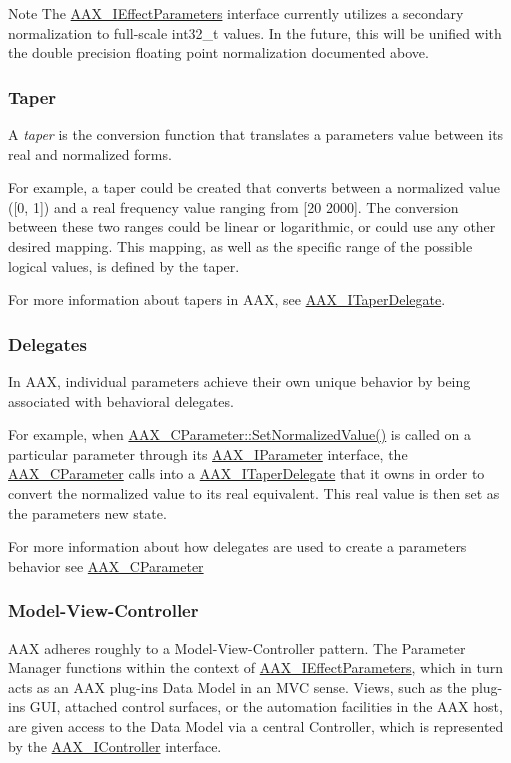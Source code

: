 \begin{DoxyNote}{Note}
The \hyperlink{a00099}{A\+A\+X\+\_\+\+I\+Effect\+Parameters} interface currently utilizes a secondary normalization to full-\/scale int32\+\_\+t values. In the future, this will be unified with the double precision floating point normalization documented above.
\end{DoxyNote}
\hypertarget{a00344_taper}{}\subsubsection{Taper}\label{a00344_taper}
A {\itshape taper} is the conversion function that translates a parameter\textquotesingle{}s value between its real and normalized forms.

For example, a taper could be created that converts between a normalized value (\mbox{[}0, 1\mbox{]}) and a real frequency value ranging from \mbox{[}20 2000\mbox{]}. The conversion between these two ranges could be linear or logarithmic, or could use any other desired mapping. This mapping, as well as the specific range of the possible logical values, is defined by the taper.

For more information about tapers in A\+A\+X, see \hyperlink{a00114}{A\+A\+X\+\_\+\+I\+Taper\+Delegate}.\hypertarget{a00344_delegates}{}\subsubsection{Delegates}\label{a00344_delegates}
In A\+A\+X, individual parameters achieve their own unique behavior by being associated with behavioral delegates.

For example, when \hyperlink{a00033_ac4f8ae8c5ecb2cd04ebc3aa2523449f7}{A\+A\+X\+\_\+\+C\+Parameter\+::\+Set\+Normalized\+Value()} is called on a particular parameter through its \hyperlink{a00108}{A\+A\+X\+\_\+\+I\+Parameter} interface, the \hyperlink{a00033}{A\+A\+X\+\_\+\+C\+Parameter} calls into a \hyperlink{a00114}{A\+A\+X\+\_\+\+I\+Taper\+Delegate} that it owns in order to convert the normalized value to its real equivalent. This real value is then set as the parameter\textquotesingle{}s new state.

For more information about how delegates are used to create a parameter\textquotesingle{}s behavior see \hyperlink{a00033}{A\+A\+X\+\_\+\+C\+Parameter}\hypertarget{a00344_model_view_controller}{}\subsubsection{Model-\/\+View-\/\+Controller}\label{a00344_model_view_controller}
A\+A\+X adheres roughly to a Model-\/\+View-\/\+Controller pattern. The Parameter Manager functions within the context of \hyperlink{a00099}{A\+A\+X\+\_\+\+I\+Effect\+Parameters}, which in turn acts as an A\+A\+X plug-\/in\textquotesingle{}s Data Model in an M\+V\+C sense. Views, such as the plug-\/in\textquotesingle{}s G\+U\+I, attached control surfaces, or the automation facilities in the A\+A\+X host, are given access to the Data Model via a central Controller, which is represented by the \hyperlink{a00090}{A\+A\+X\+\_\+\+I\+Controller} interface.

